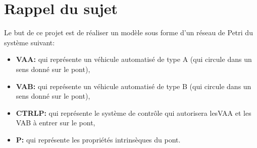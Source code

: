 \section{Rappel du sujet}
\label{sec:1}

Le but de ce projet est de réaliser un modèle sous forme d'un réseau de Petri du système suivant:\\
\begin{itemize}
    \item  \textbf{VAA:} qui représente un véhicule automatisé de type A (qui circule dans un sens donné sur le pont),
    \item  \textbf{VAB:} qui représente un véhicule automatisé de type B (qui circule dans un sens donné sur le pont),
    \item  \textbf{CTRLP:} qui représente le système de contrôle qui autorisera lesVAA et les VAB à entrer sur le pont,
    \item  \textbf{P:} qui représente les propriétés intrinsèques du pont.
\end{itemize}


